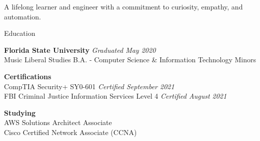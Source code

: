 \documentclass{resume} %
\begin{document}
	\begin{center}{\vspace{-0.1cm}A lifelong learner and engineer with a commitment to curiosity, empathy, and automation.\vspace{-0.1cm}}\end{center}
	\begin{rSection}{Education}
		
		{\bf Florida State University} \hfill {\em Graduated May 2020} \\
		Music Liberal Studies B.A. - Computer Science \& Information Technology Minors
		
		{\bf Certifications} \hfill {\em } \\
		CompTIA Security+ SY0-601 \hfill {\em Certified  September 2021}\\
		FBI Criminal Justice Information Services Level 4 \hfill {\em Certified August 2021}
		
		{\bf Studying}\\
		AWS Solutions Architect Associate\\
		Cisco Certified Network Associate (CCNA)
	\end{rSection}

	
\end{document}
